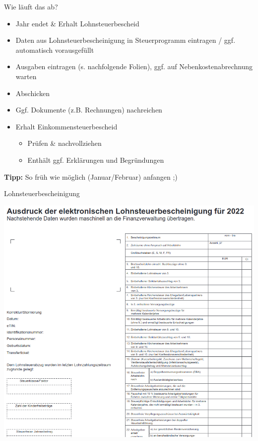 \documentclass{beamer}
\begin{document}
			\begin{frame}{Wie läuft das ab?}
				\begin{itemize}
					\item Jahr endet \& Erhalt Lohnsteuerbescheid
					\item Daten aus Lohnsteuerbescheinigung in Steuerprogramm eintragen / ggf. automatisch vorausgefüllt
					\item Ausgaben eintragen (s. nachfolgende Folien), ggf. auf Nebenkostenabrechnung warten
					\item Abschicken
					\item Ggf. Dokumente (z.B. Rechnungen) nachreichen
					\item Erhalt Einkommensteuerbescheid
					\begin{itemize}
						\item Prüfen \& nachvollziehen
						\item Enthält ggf. Erklärungen und Begründungen
					\end{itemize}
				\end{itemize}\n
				\textbf{Tipp:} So früh wie möglich (Januar/Februar) anfangen ;)
			\end{frame}
		
			\begin{frame}{Lohnsteuerbescheinigung}
				\begin{center}
					\includegraphics[width=0.65\linewidth]{images/lohnsteuerbescheinigung}
				\end{center}
			\end{frame}
		
\end{document}
